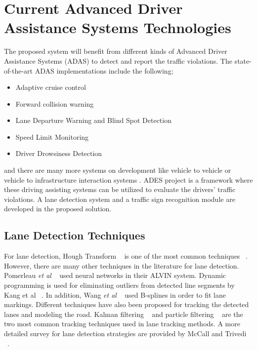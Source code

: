 \documentclass[a4paper,oneside,12pt]{report}
\begin{document}
\section{Current Advanced Driver Assistance Systems Technologies}
The proposed system will benefit from different kinds of Advanced Driver Assistance Systems (ADAS) to detect and report the traffic violations. The state-of-the-art ADAS implementations include the following;
\begin{itemize}
	\item Adaptive cruise control \cite{vahidi_research_2003}
	\item Forward collision warning \cite{dagan_forward_2004}
	\item Lane Departure Warning and Blind Spot Detection \cite{risack_video-based_2000,schofield_vehicle_1998}
	\item Speed Limit Monitoring \cite{torresen_efficient_2004}
	\item Driver Drowsiness Detection \cite{ji_real-time_2002}
\end{itemize}
and there are many more systems on development like vehicle to vehicle or vehicle to infrastructure interaction systems \cite{biswas_vehicle--vehicle_2006}. ADES project is a framework where these driving assisting systems can be utilized to evaluate the drivers' traffic violations. A lane detection system and a traffic sign recognition module are developed in the proposed solution.

\subsection{Lane Detection Techniques}
For lane detection, Hough Transform ~\cite{hough_methods_1962} is one of the most common techniques ~\cite{li_springrobot:_2004, yu_lane_1997}. However, there are many other techniques in the literature for lane detection. Pomerleau \textit{et al} ~\cite{pomerleau_neural_1996} used neural networks in their ALVIN system. Dynamic programming is used for eliminating outliers from detected line segments by Kang et al ~\cite{kang_road_2003}. In addition, Wang \textit{et al} ~\cite{wang_lane_2004} used B-splines in order to fit lane markings. Different techniques have also been proposed for tracking the detected lanes and modeling the road. Kalman filtering ~\cite{kreucher_driver_1998} and particle filtering ~\cite{apostoloff_robust_2003, zhou_robust_2006} are the two most common tracking techniques used in lane tracking methods. A more detailed survey for lane detection strategies are provided by McCall and Trivedi ~\cite{mccall_video-based_2006}.
\end{document}
